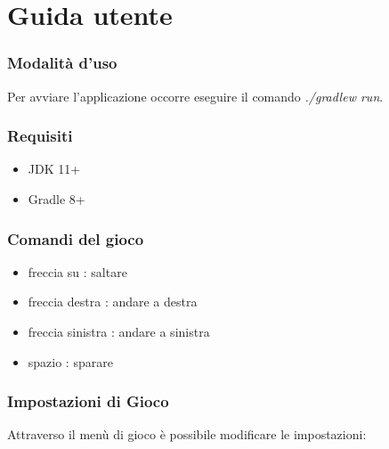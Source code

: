 
\appendix
\chapter{Guida utente}

\subsection{Modalità d'uso}

\textsf{\small Per avviare l'applicazione occorre eseguire il comando \emph{./gradlew run}.} \\

\subsection{Requisiti}

\begin{itemize}
	\item \textsf{\small JDK 11+}
	\item \textsf{\small Gradle 8+}
\end{itemize}

\subsection{Comandi del gioco}

\begin{itemize}
	\item \textsf{\small freccia su : saltare}
	\item \textsf{\small freccia destra : andare a destra}
	\item \textsf{\small freccia sinistra : andare a sinistra}
	\item \textsf{\small spazio : sparare}
\end{itemize}

\subsection{Impostazioni di Gioco}

\textsf{\small Attraverso il menù di gioco è possibile modificare le impostazioni: } \\

